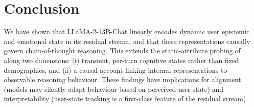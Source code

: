 \documentclass[11pt]{article}
\begin{document}
\section{Conclusion}

We have shown that LLaMA-2-13B-Chat linearly encodes dynamic user epistemic
and emotional state in its residual stream, and that these representations
causally govern chain-of-thought reasoning.  This extends the static-attribute
probing of \citet{chen2024probing} along two dimensions: (i) transient,
per-turn cognitive states rather than fixed demographics, and (ii) a causal
account linking internal representations to observable reasoning behaviour.
These findings have implications for alignment (models may silently adapt
behaviour based on perceived user state) and interpretability (user-state
tracking is a first-class feature of the residual stream).



\end{document}
